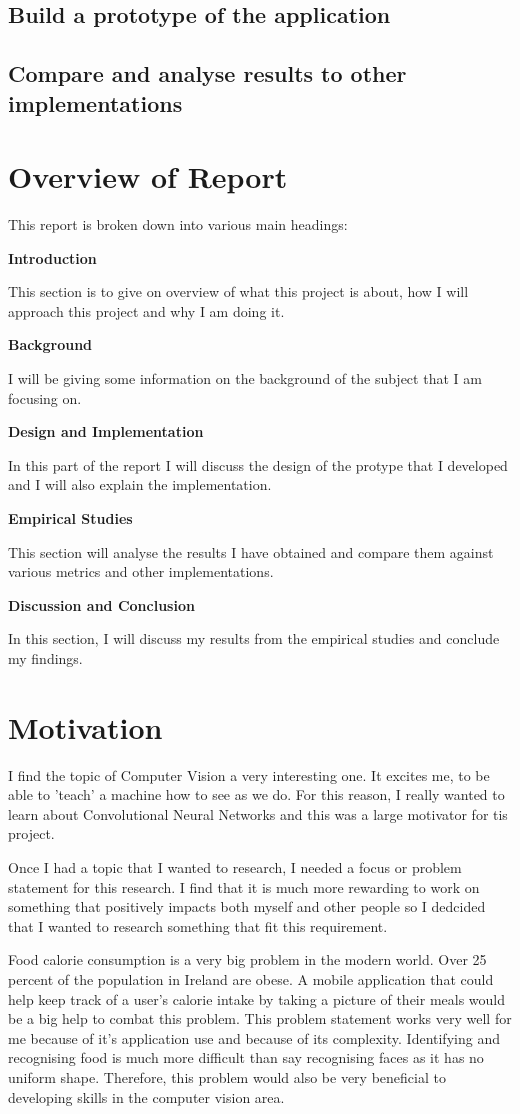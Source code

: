 \subsection{Build a prototype of the application}

\subsection{Compare and analyse results to other implementations}


\section{Overview of Report}

This report is broken down into various main headings:

\textbf{Introduction}

This section is to give on overview of what this project is about, how I will approach this project and why I am doing it.

\textbf{Background}

I will be giving some information on the background of the subject that I am focusing on.

\textbf{Design and Implementation}

In this part of the report I will discuss the design of the protype that I developed and I will also explain the implementation.

\textbf{Empirical Studies}

This section will analyse the results I have obtained and compare them against various metrics and other implementations.

\textbf{Discussion and Conclusion}

In this section, I will discuss my results from the empirical studies and conclude my findings.


\section{Motivation}
I find the topic of Computer Vision a very interesting one.
It excites me, to be able to 'teach' a machine how to see as we do.
For this reason, I really wanted to learn about Convolutional Neural Networks and this was a large motivator for tis project.

Once I had a topic that I wanted to research, I needed a focus or problem statement for this research.
I find that it is much more rewarding to work on something that positively impacts both myself and other people so I dedcided that I wanted to research something that fit this requirement.

Food calorie consumption is a very big problem in the modern world.
Over 25 percent of the population in Ireland are obese.
A mobile application that could help keep track of a user's calorie intake by taking a picture of their meals would be a big help to combat this problem.
This problem statement works very well for me because of it's application use and because of its complexity.
Identifying and recognising food is much more difficult than say recognising faces as it has no uniform shape.
Therefore, this problem would also be very beneficial to developing skills in the computer vision area.
